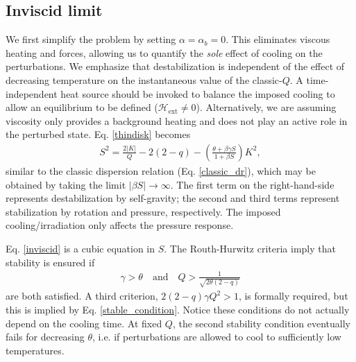 \subsection{Inviscid limit}\label{2d_inviscid}
We first simplify the problem by setting $\alpha = \alpha_b = 0$. This
eliminates viscous heating and forces, allowing us to quantify the 
\emph{sole} effect of cooling on the 
perturbations. %
We emphasize that destabilization is independent of the effect of decreasing temperature on the instantaneous
value of the classic-$Q$. A time-independent heat source should be
invoked to balance the imposed cooling to allow an equilibrium to be
defined ($\mathcal{H}_\mathrm{ext}\neq 0$). Alternatively, we are
assuming viscosity only provides a background heating and does not
play an active role in the perturbed state. %
Eq. \ref{thindisk} becomes 
\begin{align}\label{inviscid}
  S^2 = \frac{2|K|}{Q} - 2(2-q) - \left(\frac{\theta + \beta \gamma
    S}{1+\beta S}\right)K^2, 
\end{align}
similar to the classic dispersion relation
(Eq. \ref{classic_dr}), which may be obtained by taking the limit
$|\beta S|\to\infty$. %
The first term on the right-hand-side represents destabilization by self-gravity; 
the second and third terms represent stabilization by rotation and
pressure, respectively. The imposed cooling/irradiation only affects the
pressure response. %

Eq. \ref{inviscid} is a cubic equation in $S$. The 
Routh-Hurwitz criteria imply that stability is ensured if 
\begin{align}\label{stable_condition}
  \gamma > \theta \quad \text{and} \quad 
  Q > \frac{1}{\sqrt{2\theta(2-q)}} 
\end{align}
are both satisfied. 
A third criterion, $2(2-q)\gamma Q^2>1$, is formally required, but this
is implied by Eq. \ref{stable_condition}. 
Notice these conditions do not actually depend on the cooling time. 
At fixed $Q$, the second stability condition eventually fails for
decreasing $\theta$, i.e. if perturbations are allowed
to cool to sufficiently low temperatures.  

